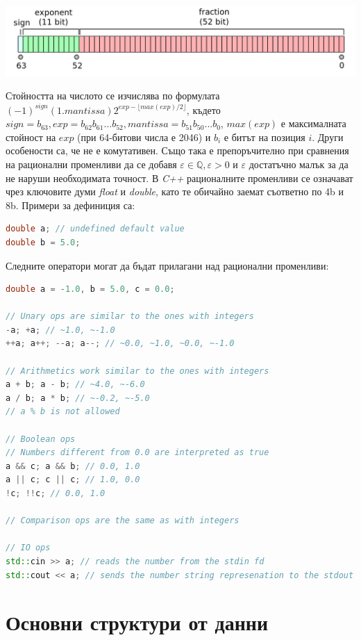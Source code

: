 \documentclass[fleqn,12pt]{article}
\begin{document}
\includegraphics[width=\textwidth]{floating_point_num.png}

Стойността на числото се изчислява по формулата $(-1)^{sign} (1.mantissa) 2^{exp - \lfloor max(exp)/2 \rfloor}$, където $sign = b_{63}, exp = b_{62}b_{61} \dots b_{52}, mantissa = b_{51}b_{50} \dots b_{0}$, $max(exp)$ е максималната стойност на $exp$ (при 64-битови числа е 2046) и $b_i$ е битът на позиция $i$.
\bigbreak
Други особености са, че не е комутативен. Също така е препоръчително при сравнения на рационални променливи да се добавя $\varepsilon \in \mathbb{Q}, \varepsilon > 0$ и $\varepsilon$ достатъчно малък за да не наруши необходимата точност.
\bigbreak
В \textit{C++} рационалните променливи се означават чрез ключовите думи \textit{float} и \textit{double}, като те обичайно заемат съответно по 4b и 8b. Примери за дефиниция са:

\begin{lstlisting}[language=C++, caption=Real numbers]
double a; // undefined default value
double b = 5.0;
\end{lstlisting}

Следните оператори могат да бъдат прилагани над рационални променливи:

\begin{lstlisting}[language=C++, caption=Real number operations]
double a = -1.0, b = 5.0, c = 0.0;

// Unary ops are similar to the ones with integers
-a; +a; // ~1.0, ~-1.0
++a; a++; --a; a--; // ~0.0, ~1.0, ~0.0, ~-1.0

// Arithmetics work similar to the ones with integers
a + b; a - b; // ~4.0, ~-6.0
a / b; a * b; // ~-0.2, ~-5.0
// a % b is not allowed

// Boolean ops
// Numbers different from 0.0 are interpreted as true
a && c; a && b; // 0.0, 1.0
a || c; c || c; // 1.0, 0.0
!c; !!c; // 0.0, 1.0

// Comparison ops are the same as with integers

// IO ops
std::cin >> a; // reads the number from the stdin fd
std::cout << a; // sends the number string represenation to the stdout fd
\end{lstlisting}

\section{Основни структури от данни}
\end{document}
